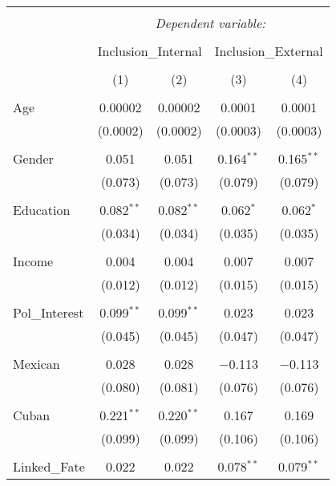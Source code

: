 
\begin{table}[!htbp] \centering 
  \caption{} 
  \label{} 
\begin{tabular}{@{\extracolsep{5pt}}lcccc} 
\\[-1.8ex]\hline 
\hline \\[-1.8ex] 
 & \multicolumn{4}{c}{\textit{Dependent variable:}} \\ 
\cline{2-5} 
\\[-1.8ex] & \multicolumn{2}{c}{Inclusion\_Internal} & \multicolumn{2}{c}{Inclusion\_External} \\ 
\\[-1.8ex] & (1) & (2) & (3) & (4)\\ 
\hline \\[-1.8ex] 
 Age & 0.00002 & 0.00002 & 0.0001 & 0.0001 \\ 
  & (0.0002) & (0.0002) & (0.0003) & (0.0003) \\ 
  & & & & \\ 
 Gender & 0.051 & 0.051 & 0.164$^{**}$ & 0.165$^{**}$ \\ 
  & (0.073) & (0.073) & (0.079) & (0.079) \\ 
  & & & & \\ 
 Education & 0.082$^{**}$ & 0.082$^{**}$ & 0.062$^{*}$ & 0.062$^{*}$ \\ 
  & (0.034) & (0.034) & (0.035) & (0.035) \\ 
  & & & & \\ 
 Income & 0.004 & 0.004 & 0.007 & 0.007 \\ 
  & (0.012) & (0.012) & (0.015) & (0.015) \\ 
  & & & & \\ 
 Pol\_Interest & 0.099$^{**}$ & 0.099$^{**}$ & 0.023 & 0.023 \\ 
  & (0.045) & (0.045) & (0.047) & (0.047) \\ 
  & & & & \\ 
 Mexican & 0.028 & 0.028 & $-$0.113 & $-$0.113 \\ 
  & (0.080) & (0.081) & (0.076) & (0.076) \\ 
  & & & & \\ 
 Cuban & 0.221$^{**}$ & 0.220$^{**}$ & 0.167 & 0.169 \\ 
  & (0.099) & (0.099) & (0.106) & (0.106) \\ 
  & & & & \\ 
 Linked\_Fate & 0.022 & 0.022 & 0.078$^{**}$ & 0.079$^{**}$ \\ 

\end{tabular}
\end{table}
